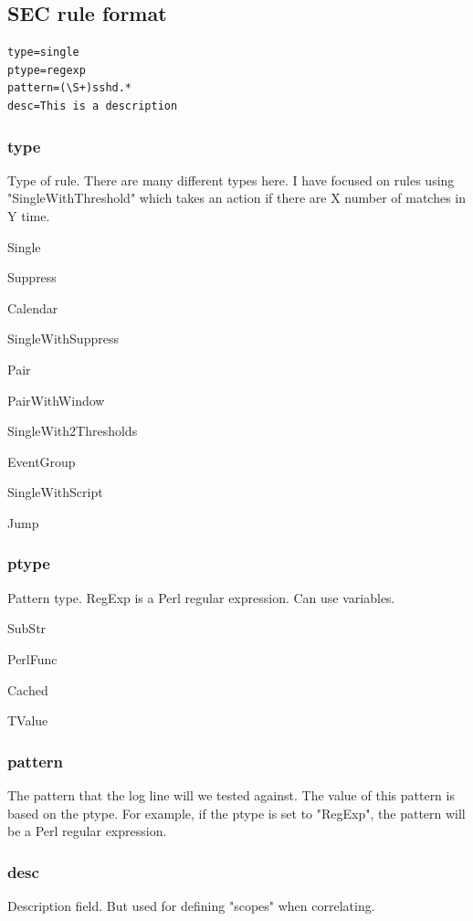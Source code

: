 \subsection{SEC rule format}



\begin{lstlisting}
type=single
ptype=regexp
pattern=(\S+)sshd.*
desc=This is a description
\end{lstlisting}

\subsubsection{type}
Type of rule. There are many different types here.
I have focused on rules using "SingleWithThreshold" which takes an action if there are X number of matches in Y time.

Single

Suppress

Calendar

SingleWithSuppress

Pair

PairWithWindow

SingleWith2Thresholds

EventGroup

SingleWithScript

Jump

\subsubsection{ptype}
Pattern type. RegExp is a Perl regular expression. Can use variables.

SubStr

PerlFunc

Cached

TValue

\subsubsection{pattern}
The pattern that the log line will we tested against. The value of this pattern is based on the ptype. For example, if the ptype is set to "RegExp", the pattern will be a Perl regular expression.

\subsubsection{desc}
Description field. But used for defining "scopes" when correlating.

